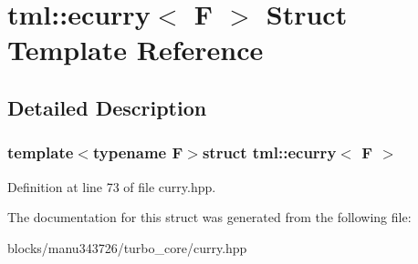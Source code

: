 \hypertarget{structtml_1_1ecurry}{\section{tml\+:\+:ecurry$<$ F $>$ Struct Template Reference}
\label{structtml_1_1ecurry}
}


\subsection{Detailed Description}
\subsubsection*{template$<$typename F$>$struct tml\+::ecurry$<$ F $>$}



Definition at line 73 of file curry.\+hpp.



The documentation for this struct was generated from the following file\+:\begin{DoxyCompactItemize}
\item 
blocks/manu343726/turbo\+\_\+core/curry.\+hpp\end{DoxyCompactItemize}
